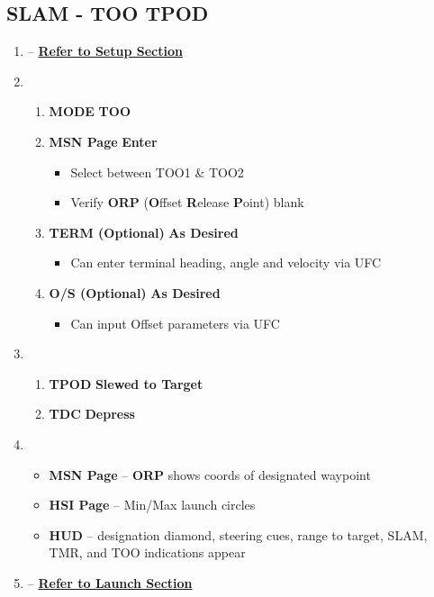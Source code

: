 \documentclass[fontInter]{TechCheck}
\begin{document}

	\clearpage

	\subsection{SLAM - TOO TPOD}
	\begin{enumerate}[leftmargin=0.1\textwidth, rightmargin=0.1\textwidth, itemsep=4pt, label=\textbf{\arabic*.}]
		\item {} -- \hyperref[subsec:slamsetup]{\textbf{Refer to Setup Section}}
		\item {}
		\begin{enumerate}[itemsep=4pt]
			\item \textbf{MODE} \dotfill \textbf{TOO}
			\item \textbf{MSN Page} \dotfill \textbf{Enter}
			\begin{itemize}
				\item Select between TOO1 \& TOO2
				\item Verify \textbf{ORP} (\textbf{O}ffset \textbf{R}elease \textbf{P}oint) blank
			\end{itemize}
			\item \textbf{TERM (Optional)} \dotfill \textbf{As Desired}
			\begin{itemize}
				\item Can enter terminal heading, angle and velocity via UFC
			\end{itemize}
			\item \textbf{O/S (Optional)} \dotfill \textbf{As Desired}
			\begin{itemize}
				\item Can input Offset parameters via UFC
			\end{itemize}
		\end{enumerate}
		\item {}
		\begin{enumerate}[itemsep=4pt]
			\item \textbf{TPOD} \dotfill \textbf{Slewed to Target}
			\item \textbf{TDC} \dotfill \textbf{Depress} 
		\end{enumerate}
		\item {}
		\begin{itemize}
			\item \textbf{MSN Page} -- \textbf{ORP} shows coords of designated waypoint
			\item \textbf{HSI Page} -- Min/Max launch circles
			\item \textbf{HUD} -- designation diamond, steering cues, range to target, SLAM, TMR, and TOO indications appear
		\end{itemize}
		\item {} -- \hyperref[subsec:slamlaunch]{\textbf{Refer to Launch Section}}
	\end{enumerate}
\end{document}
